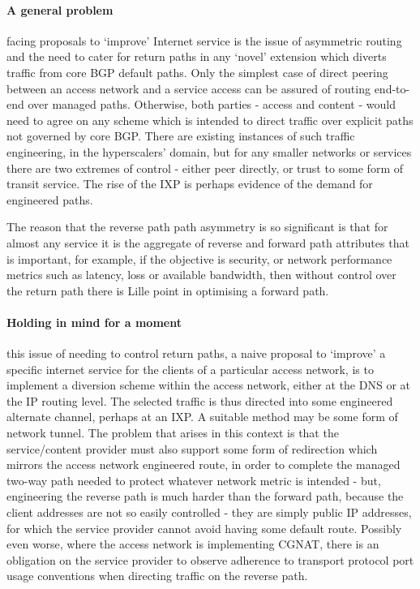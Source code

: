 \paragraph{A general problem} facing proposals to `improve' Internet service is the issue of asymmetric routing and the need to cater for return paths in any `novel' extension which diverts traffic from core BGP default paths.  Only the simplest case of direct peering between an access network and a service access can be assured of routing end-to-end over managed paths.  Otherwise, both parties - access and content - would need to agree on any scheme which is intended to direct traffic over explicit paths not governed by core BGP.  There are existing instances of such traffic engineering, in the hyperscalers' domain, but for any smaller networks or services there are two extremes of control - either peer directly, or trust to some form of transit service.  The rise of the IXP is perhaps evidence of the demand for engineered paths.

The reason that the reverse path  path asymmetry is so significant is that for almost any service it is the aggregate of reverse and forward path attributes that is important, for example, if the objective is security, or network performance metrics such as latency, loss or available bandwidth, then without control over the return path there is Lille point in optimising a forward path.

\paragraph{Holding in mind for a moment} this issue of needing to control return paths, a naive proposal to `improve' a specific internet service for the clients of a particular access network, is to implement a diversion scheme within the access network, either at the DNS or at the IP routing level.  The selected traffic is thus directed into some engineered alternate channel, perhaps at an IXP.  A suitable method may be some form of network tunnel.
The problem that arises in this context is that the service/content provider must also support some form of redirection which mirrors the access network engineered route, in order to complete the managed two-way path needed to protect whatever network metric is intended - but, engineering the reverse path is much harder than the forward path, because the client addresses are not so easily controlled - they are simply public IP addresses, for which the service provider cannot avoid having some default route.  Possibly even worse, where the access network is implementing CGNAT, there is an obligation on the service provider to observe adherence to transport protocol port usage conventions when directing traffic on the reverse path.


